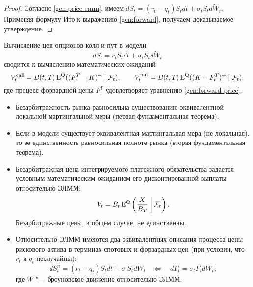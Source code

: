 \begin{proof}
Согласно \eqref{gen:price-emm}, имеем $dS_t = (r_t-q_t) S_t dt + \sigma_t S_t d\tilde W_t$. 
Применяя формулу Ито к выражению \eqref{gen:forward}, получаем доказываемое утверждение.
\end{proof}

\begin{example}
Вычисление цен опционов колл и пут в модели
\[
dS_t = r_tS_t dt + \sigma_t S_t d \tilde W_t
\]
сводится к вычислению математических ожиданий
\[
V^{\text{\normalfont call}}_t = B(t,T) \operatorname{E}^{\mathrm{Q}} ((F_t^T - K)^+ \mid \mathcal{F}_t), \qquad
V^{\text{\normalfont put}}_t = B(t,T) \operatorname{E}^{\mathrm{Q}} ((K - F_t^T)^+ \mid \mathcal{F}_t),
\]
где процесс форвардной цены $F_t^T$ удовлетворяет уравнению \eqref{gen:forward-price}.
\end{example}


\summary

\begin{itemize}
\item Безарбитражность рынка равносильна существованию эквивалентной локальной мартингальной меры (первая фундаментальная теорема).

\item Если в модели существует эквивалентная мартингальная мера (не локальная), то ее единственность равносильная полноте рынка (вторая фундаментальная теорема).

\item Безарбитражная цена интегрируемого платежного обязательства задается условным математическим ожиданием его дисконтированной выплаты относительно ЭЛММ:
\[
V_t = B_t \operatorname{E}^{\mathrm{Q}} \left(\frac{X}{B_T} \;\bigg|\; \mathcal{F}_t\right).
\]
Безарбитражные цены, в общем случае, не единственны.

\item Относительно ЭЛММ имеются два эквивалентных описания процесса цены рискового актива в терминах спотовых и форвардных цен (при условии, что $r_t$ и $q_t$ неслучайны):
\[
dS_t^n = (r_t-q_t) S_t dt + \sigma_t S_t d W_t
\quad\iff\quad
d F_t = \sigma_t F_t d W_t,
\]
где $W$ "--- броуновское движение относительно ЭЛММ.
\end{itemize}

